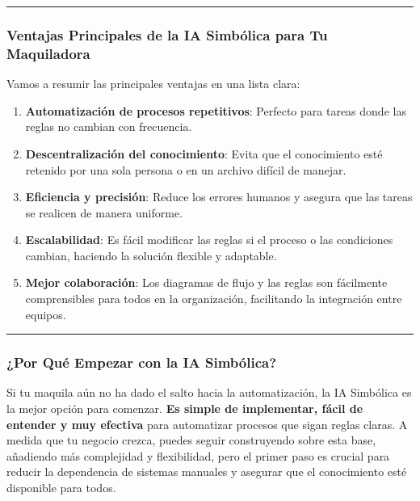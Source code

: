 \documentclass[
  10pt,
  letterpaper,
]{book}
\providecommand{\tightlist}{%
  \setlength{\itemsep}{0pt}\setlength{\parskip}{0pt}}\usepackage{longtable,booktabs,array}
\begin{document}
\begin{center}\rule{0.5\linewidth}{0.5pt}\end{center}

\subsubsection{Ventajas Principales de la IA Simbólica para Tu
Maquiladora}\label{ventajas-principales-de-la-ia-simbuxf3lica-para-tu-maquiladora}

Vamos a resumir las principales ventajas en una lista clara:

\begin{enumerate}
\def\labelenumi{\arabic{enumi}.}
\tightlist
\item
  \textbf{Automatización de procesos repetitivos}: Perfecto para tareas
  donde las reglas no cambian con frecuencia.
\item
  \textbf{Descentralización del conocimiento}: Evita que el conocimiento
  esté retenido por una sola persona o en un archivo difícil de manejar.
\item
  \textbf{Eficiencia y precisión}: Reduce los errores humanos y asegura
  que las tareas se realicen de manera uniforme.
\item
  \textbf{Escalabilidad}: Es fácil modificar las reglas si el proceso o
  las condiciones cambian, haciendo la solución flexible y adaptable.
\item
  \textbf{Mejor colaboración}: Los diagramas de flujo y las reglas son
  fácilmente comprensibles para todos en la organización, facilitando la
  integración entre equipos.
\end{enumerate}

\begin{center}\rule{0.5\linewidth}{0.5pt}\end{center}

\subsubsection{¿Por Qué Empezar con la IA
Simbólica?}\label{por-quuxe9-empezar-con-la-ia-simbuxf3lica}

Si tu maquila aún no ha dado el salto hacia la automatización, la IA
Simbólica es la mejor opción para comenzar. \textbf{Es simple de
implementar, fácil de entender y muy efectiva} para automatizar procesos
que sigan reglas claras. A medida que tu negocio crezca, puedes seguir
construyendo sobre esta base, añadiendo más complejidad y flexibilidad,
pero el primer paso es crucial para reducir la dependencia de sistemas
manuales y asegurar que el conocimiento esté disponible para todos.
\end{document}
